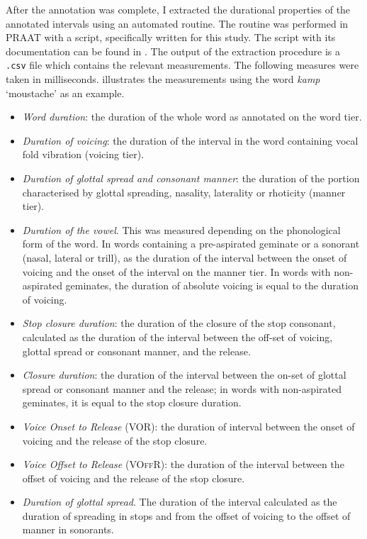 \documentclass[11pt,a4paper,openany]{memoir}\usepackage[]{graphicx}\usepackage[]{color}
\begin{document}
After the annotation was complete, I extracted the durational properties of the annotated intervals using an automated routine.
The routine was performed in PRAAT with a script, specifically written for this study.
The script with its documentation can be found in .
The output of the extraction procedure is a \texttt{.csv} file which contains the relevant measurements.
The following measures were taken in milliseconds.
 illustrates the measurements using the word \textit{kamp} `moustache' as an example.

\begin{itemize}
\item \textit{Word duration}: the duration of the whole word as annotated on the word tier.
\item \textit{Duration of voicing}: the duration of the interval in the word containing vocal fold vibration (voicing tier).
\item \textit{Duration of glottal spread and consonant manner}: the duration of the portion characterised by glottal spreading, nasality, laterality or rhoticity (manner tier).
\item \textit{Duration of the vowel}.
This was measured depending on the phonological form of the word.
In words containing a pre-aspirated geminate or a sonorant (nasal, lateral or trill), as the duration of the interval between the onset of voicing and the onset of the interval on the manner tier.
In words with non-aspirated geminates, the duration of absolute voicing is equal to the duration of voicing.
\item \textit{Stop closure duration}: the duration of the closure of the stop consonant, calculated as the duration of the interval between the off-set of voicing, glottal spread or consonant manner, and the release.
\item \textit{Closure duration}: the duration of the interval between the on-set of glottal spread or consonant manner and the release; in words with non-aspirated geminates, it is equal to the stop closure duration.
\item \textit{Voice Onset to Release} (VOR): the duration of interval between the onset of voicing and the release of the stop closure.
\item \textit{Voice Offset to Release} (\textsc{VOffR}): the duration of the interval between the offset of voicing and the release of the stop closure.
\item \textit{Duration of glottal spread}. The duration of the interval calculated as the duration of spreading in stops and from the offset of voicing to the offset of manner in sonorants.
\end{itemize}
\end{document}
